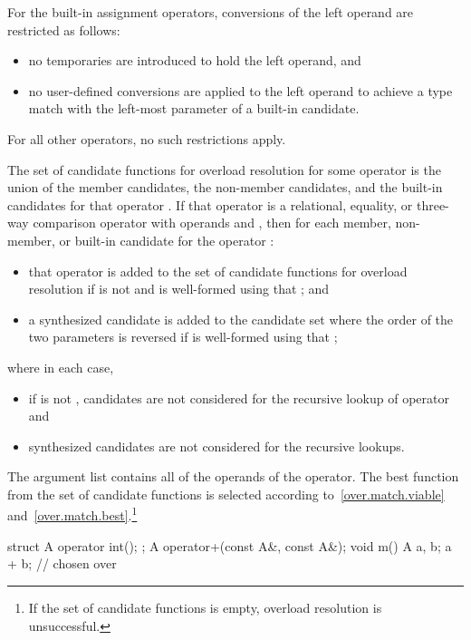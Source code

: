 \pnum
For the built-in assignment operators, conversions of the left
operand are restricted as follows:

\begin{itemize}
\item
no temporaries are introduced to hold the left operand, and
\item
no user-defined conversions are applied to the left operand to achieve
a type match with the left-most parameter of a built-in candidate.
\end{itemize}

\pnum
For all other operators, no such restrictions apply.

\pnum
The set of candidate functions for overload resolution
for some operator 
is the
union of the member candidates, the non-member candidates, and
the built-in candidates for that operator .
If that operator is a
relational,
equality,
or three-way comparison
operator
with operands  and ,
then for each member, non-member, or built-in candidate
for the operator \tcode{<=>}:
\begin{itemize}
\item
that operator is added to the set of candidate functions for overload resolution
if  is not \tcode{<=>}
and  is well-formed using that ; and
\item
a synthesized candidate is added to the candidate set
where the order of the two parameters is reversed
if  is well-formed using that ;
\end{itemize}
where in each case,
\begin{itemize}
\item if  is not \tcode{<=>},
 candidates
are not considered for the recursive lookup of operator 
and
\item
synthesized  candidates
are not considered for the recursive lookups.
\end{itemize}

\pnum
The argument list contains all of the
operands of the operator.
The best function from the set of candidate functions is selected
according to~\ref{over.match.viable}
and~\ref{over.match.best}.\footnote{If the set of candidate functions is empty,
overload resolution is unsuccessful.}
\begin{example}

\begin{codeblock}
struct A {
  operator int();
};
A operator+(const A&, const A&);
void m() {
  A a, b;
  a + b;                        //  chosen over 
}
\end{codeblock}
\end{example}


